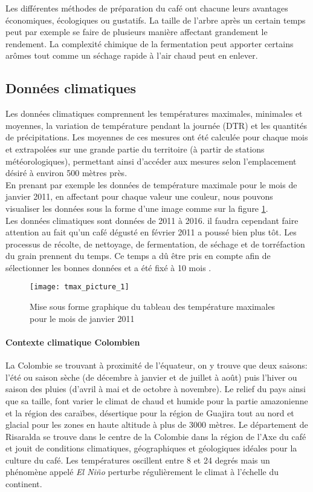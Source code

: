 \noindent Les différentes méthodes de préparation du café ont chacune leurs avantages économiques, écologiques ou gustatifs. La taille de l'arbre après un certain temps peut par exemple se faire de plusieurs manière affectant grandement le rendement. La complexité chimique de la fermentation peut apporter certains arômes tout comme un séchage rapide à l'air chaud peut en enlever. 

 
\subsection{Données climatiques}
Les données climatiques comprennent les températures maximales, minimales et moyennes, la variation de température pendant la journée (DTR) et les quantités de précipitations. Les moyennes de ces mesures ont été calculée pour chaque mois et extrapolées sur une grande partie du territoire (à partir de stations météorologiques), permettant ainsi d’accéder aux mesures selon l’emplacement désiré à environ 500 mètres près. \\

\noindent En prenant par exemple les données de température maximale pour le mois de janvier 2011, en affectant pour chaque valeur une couleur, nous pouvons visualiser les données sous la forme d'une image comme sur la figure \ref{tmax_picture}.\\

\noindent Les données climatiques sont données de 2011 à 2016. il faudra cependant faire attention au fait qu'un café dégusté en février 2011 a poussé bien plus tôt. Les processus de récolte, de nettoyage, de fermentation, de séchage et de torréfaction du grain prennent du temps. Ce temps a dû être pris en compte afin de sélectionner les bonnes données et a été fixé à 10 mois . 


\begin{figure}[H]
	\texttt{[image: tmax\_picture\_1]}
	\caption{\label{tmax_picture} Mise sous forme graphique du tableau des température maximales pour le mois de janvier 2011 }
\end{figure}

\paragraph{Contexte climatique Colombien}La Colombie se trouvant à proximité de l'équateur, on y trouve que deux saisons: l'été ou saison sèche (de décembre à janvier et de juillet à août) puis l'hiver ou saison des pluies (d'avril à mai et de octobre à novembre). Le relief du pays ainsi que sa taille, font varier le climat de chaud et humide pour la partie amazonienne et la région des caraïbes, désertique pour la région de Guajira tout au nord et glacial pour les zones en haute altitude à plus de 3000 mètres. Le département de Risaralda se trouve dans le centre de la Colombie dans la région de l'Axe du café et jouit de conditions climatiques, géographiques et géologiques idéales pour la culture du café. Les températures oscillent entre 8 et 24 degrés mais un phénomène appelé \textit{El Niño} perturbe régulièrement le climat à l'échelle du continent. 

